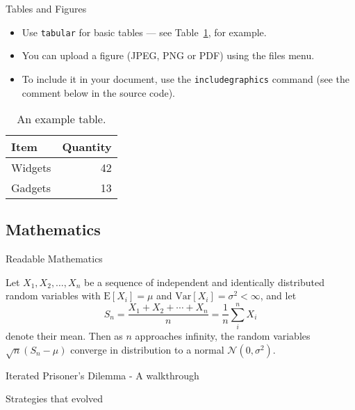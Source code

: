 \documentclass{beamer}
\begin{document}
\begin{frame}{Tables and Figures}

\begin{itemize}
\item Use \texttt{tabular} for basic tables --- see Table~\ref{tab:widgets}, for example.
\item You can upload a figure (JPEG, PNG or PDF) using the files menu. 
\item To include it in your document, use the \texttt{includegraphics} command (see the comment below in the source code).
\end{itemize}


\begin{table}
\centering
\begin{tabular}{l|r}
Item & Quantity \\\hline
Widgets & 42 \\
Gadgets & 13
\end{tabular}
\caption{\label{tab:widgets}An example table.}
\end{table}

\end{frame}

\subsection{Mathematics}

\begin{frame}{Readable Mathematics}

Let $X_1, X_2, \ldots, X_n$ be a sequence of independent and identically distributed random variables with $\text{E}[X_i] = \mu$ and $\text{Var}[X_i] = \sigma^2 < \infty$, and let
$$S_n = \frac{X_1 + X_2 + \cdots + X_n}{n}
      = \frac{1}{n}\sum_{i}^{n} X_i$$
denote their mean. Then as $n$ approaches infinity, the random variables $\sqrt{n}(S_n - \mu)$ converge in distribution to a normal $\mathcal{N}(0, \sigma^2)$.
\end{frame}
\begin{frame}{Iterated Prisoner's Dilemma - A walkthrough}
\end{frame}
\begin{frame}{Strategies that evolved}
\end{frame}
\end{document}
